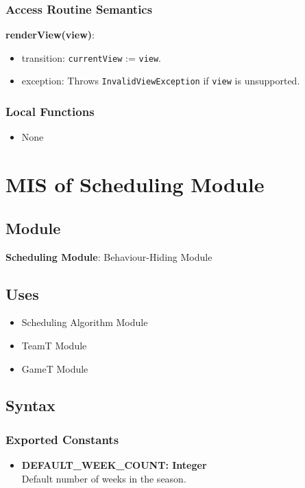 \documentclass[12pt, titlepage]{article}
\begin{document}
\subsubsection{Access Routine Semantics}

\noindent \textbf{renderView(view)}:
\begin{itemize}
  \item transition: \texttt{currentView} := \texttt{view}.
  \item exception: Throws \texttt{InvalidViewException} if \texttt{view} is unsupported.
\end{itemize}

\subsubsection{Local Functions}
\begin{itemize}
  \item None
\end{itemize}

\section{MIS of Scheduling Module} \label{SchedulingModule}

\subsection{Module}
\textbf{Scheduling Module}: Behaviour-Hiding Module

\subsection{Uses}
\begin{itemize}
  \item Scheduling Algorithm Module
  \item TeamT Module
  \item GameT Module
\end{itemize}

\subsection{Syntax}

\subsubsection{Exported Constants}

\begin{itemize}
  \item \textbf{DEFAULT\_WEEK\_COUNT: Integer} \\ Default number of weeks in the season.
\end{itemize}
\end{document}
